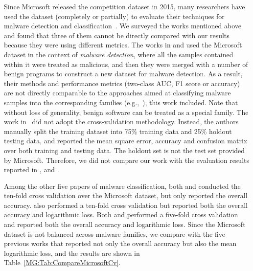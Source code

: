 Since Microsoft released the competition dataset in 2015, many researchers have used the dataset (completely or partially) to evaluate their techniques for malware detection and classification~\cite{NovelFeatureFusion, EnsembleDNN, AutoEncoderMicrosoft, FunctionCallGraph, StaticFeatures, PolySeqCls, AutoEncoderFeatureLearn, YuxinMalwareDnn}.
We surveyed the works mentioned above and found that three of them cannot be directly compared with our results because they were using different metrics.
The works in \cite{EnsembleDNN} and \cite{YuxinMalwareDnn} used the Microsoft dataset in the context of \emph{malware detection}, where all the samples contained within it were treated as malicious, and then they were merged with a number of benign programs to construct a new dataset for malware detection.
As a result, their methods and performance metrics (two-class AUC, F1 score or accuracy) are not directly comparable to the approaches aimed at classifying malware samples into the corresponding families (e.g.,~\cite{NovelFeatureFusion, AutoEncoderMicrosoft, FunctionCallGraph, StaticFeatures, PolySeqCls, AutoEncoderFeatureLearn}), this work included. %
Note that without loss of generality, benign software can be treated as a special family.
The work in~\cite{AutoEncoderMicrosoft} did not adopt the cross-validation methodology. Instead, the authors manually split the training dataset into 75\% training data and 25\% holdout testing data, and reported the mean square error, accuracy and confusion matrix over both training and testing data.
The holdout set is not the test set provided by Microsoft. 
Therefore, we did not compare our work with the evaluation results reported in \cite{EnsembleDNN}, \cite{YuxinMalwareDnn} and \cite{AutoEncoderMicrosoft}.

Among the other five papers of malware classification, both \cite{FunctionCallGraph} and \cite{StaticFeatures} conducted the ten-fold cross validation over the Microsoft dataset, but only reported the overall accuracy.
\cite{PolySeqCls} also performed a ten-fold cross validation but reported both the overall accuracy and logarithmic loss.
Both \cite{NovelFeatureFusion} and \cite{AutoEncoderFeatureLearn} performed a five-fold cross validation and reported both the overall accuracy and logarithmic loss.
Since the Microsoft dataset is not balanced across malware families, we compare \sysname with the five previous works that reported not only the overall accuracy but also the mean logarithmic loss, and the results are shown in Table~\ref{MG:Tab:CompareMicrosoftCv}.

